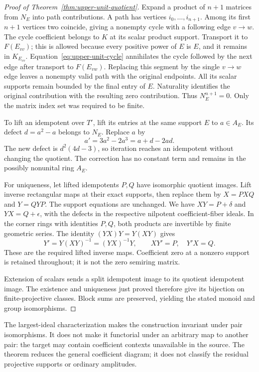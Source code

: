 \begin{proof}[Proof of Theorem~\ref{thm:upper-unit-quotient}]
Expand a product of $n+1$ matrices from $N_E$ into path
contributions. A path has vertices $i_0,\ldots,i_{n+1}$.
Among its first $n+1$ vertices two coincide, giving a nonempty cycle
with a following edge $v\to w$. The cycle coefficient belongs to $K$
at its scalar product support. Transport it to $F(E_{vv})$; this is
allowed because every positive power of $E$ is $E$, and it remains
in $K_{E_{vv}}$. Equation~\eqref{eq:upper-unit-cycle} annihilates the
cycle followed by the next edge after transport to $F(E_{vw})$.
Replacing this segment by the single $v\to w$ edge leaves a
nonempty valid path with the original endpoints. All its scalar
supports remain bounded by the final entry of $E$. Naturality
identifies the original contribution with the resulting zero
contribution. Thus $N_E^{n+1}=0$. Only the matrix index set was
required to be finite.

To lift an idempotent over $T'$, lift its entries at the same support
$E$ to $a\in A_E$. Its defect $d=a^2-a$ belongs to $N_E$.
Replace $a$ by
\[
 a'=3a^2-2a^3=a+d-2ad.
\]
The new defect is $d^2(4d-3)$, so iteration reaches an idempotent
without changing the quotient. The correction has no constant term
and remains in the possibly nonunital ring $A_E$.

For uniqueness, let lifted idempotents $P,Q$ have isomorphic quotient
images. Lift inverse rectangular maps at their exact supports, then
replace them by $X=PXQ$ and $Y=QYP$. The support equations are
unchanged. We have $XY=P+\delta$ and $YX=Q+\epsilon$, with the
defects in the respective nilpotent coefficient-fiber ideals. In
the corner rings with identities $P,Q$, both products are invertible
by finite geometric series. The identity $(YX)Y=Y(XY)$ gives
\[
 Y'=Y(XY)^{-1}=(YX)^{-1}Y,\qquad XY'=P,\quad Y'X=Q.
\]
These are the required lifted inverse maps. Coefficient zero at a
nonzero support is retained throughout; it is not the zero semiring
matrix.

Extension of scalars sends a split idempotent image to its quotient
idempotent image. The existence and uniqueness just proved therefore
give its bijection on finite-projective classes. Block sums are
preserved, yielding the stated monoid and group isomorphisms.
\end{proof}

The largest-ideal characterization makes the construction invariant
under pair isomorphisms. It does not make it functorial under an
arbitrary map to another pair: the target may contain coefficient
contexts unavailable in the source. The theorem reduces the general
coefficient diagram; it does not classify the residual projective
supports or ordinary amplitudes.
